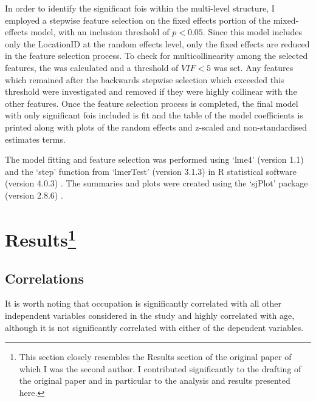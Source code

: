 In order to identify the significant \glspl{foi} within the multi-level structure, I employed a stepwise feature selection on the fixed effects portion of the mixed-effects model, with an inclusion threshold of $p < 0.05$. Since this model includes only the LocationID at the random effects level, only the fixed effects are reduced in the feature selection process. To check for multicollinearity among the selected features, the  was calculated and a threshold of $VIF < 5$ was set. Any features which remained after the backwards stepwise selection which exceeded this threshold were investigated and removed if they were highly collinear with the other features. Once the feature selection process is completed, the final model with only significant \glspl{foi} included is fit and the table of the model coefficients is printed along with plots of the random effects and z-scaled and non-standardised estimates terms. 

The model fitting and feature selection was performed using `lme4' (version 1.1) and the `step' function from `lmerTest' (version 3.1.3) \citep{Kuznetsova2017lmerTest} in R statistical software (version 4.0.3) \citep{RCT2018R}. The summaries and plots were created using the `sjPlot' package (version 2.8.6) \citep{Luedecke2021sjPlot}.

\section[Results]{Results\footnote{This section closely resembles the Results section of the original paper \citep{Erfanian2021Psychological} of which I was the second author. I contributed significantly to the drafting of the original paper and in particular to the analysis and results presented here.}}


\subsection{Correlations}

 It is worth noting that occupation is significantly correlated with all other independent variables considered in the study and highly correlated with age, although it is not significantly correlated with either of the dependent variables.  

